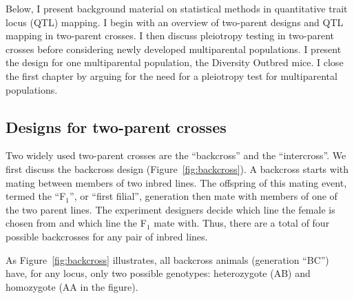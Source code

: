 \documentclass[]{article}\usepackage[]{graphicx}\usepackage[]{color}
\begin{document}

































Below, I present background material on statistical methods in quantitative trait locus
(QTL) mapping. I begin with an overview of two-parent designs and 
QTL mapping in two-parent crosses.
I then discuss pleiotropy testing in two-parent crosses before considering newly
developed multiparental populations.
I present the design for one multiparental population, the Diversity Outbred mice.
I close the first chapter by arguing for the need for a pleiotropy test for multiparental populations.


\subsection{Designs for two-parent crosses}

Two widely used two-parent crosses are the ``backcross'' and the ``intercross''. We first discuss the backcross design (Figure~\ref{fig:backcross}). A backcross starts with mating between members of two inbred lines. The offspring of this mating event, termed the ``F$_1$'', or ``first filial'', generation then mate with members of one of the two parent lines. The experiment designers decide which line the female is chosen from and which line the F$_1$ mate with. Thus, there are a total of four possible backcrosses for any pair of inbred lines. 

As Figure~\ref{fig:backcross} illustrates, all backcross animals (generation ``BC'') have, for any locus, only two possible genotypes: heterozygote (AB) and homozygote (AA in the figure). 
\end{document}
